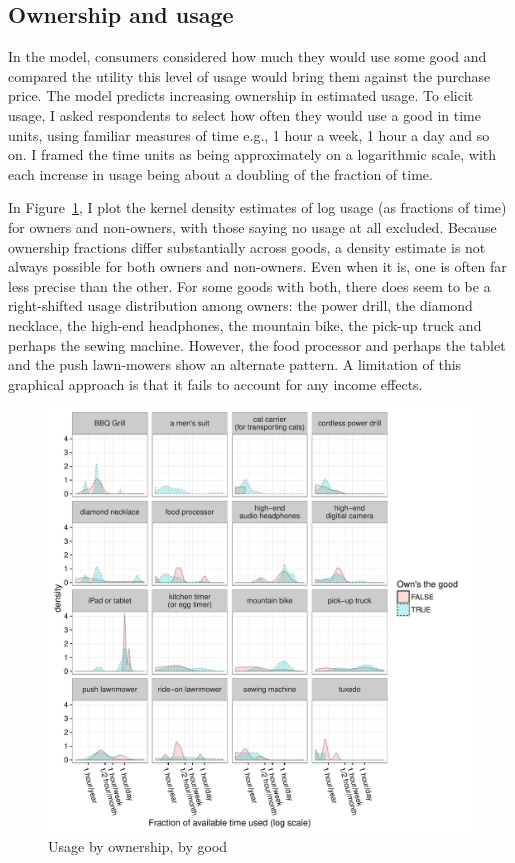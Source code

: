\documentclass[11pt]{article}
\begin{document}


\subsection{Ownership and usage} 
In the model, consumers considered how much they would use some good and compared the utility this level of usage would bring them against the purchase price. 
The model predicts increasing ownership in estimated usage. 
To elicit usage, I asked respondents to select how often they would use a good in time units, using familiar measures of time e.g., 1 hour a week, 1 hour a day and so on.
I framed the time units as being approximately on a logarithmic scale, with each increase in usage being about a doubling of the fraction of time.  

In Figure~\ref{fig:ownership_distro}, I plot the kernel density estimates of log usage (as fractions of time) for owners and non-owners, with those saying no usage at all excluded. 
Because ownership fractions differ substantially across goods, a density estimate is not always possible for both owners and non-owners. 
Even when it is, one is often far less precise than the other. 
For some goods with both, there does seem to be a right-shifted usage distribution among owners: 
the power drill, the diamond necklace, the high-end headphones, the mountain bike, the pick-up truck and perhaps the sewing machine. 
However, the food processor and perhaps the tablet and the push lawn-mowers show an alternate pattern. 
A limitation of this graphical approach is that it fails to account for any income effects. 

\begin{figure}
\centering 
\caption{Usage by ownership, by good \label{fig:ownership_distro}}
\begin{minipage}{0.90 \linewidth}
\includegraphics[width = \linewidth]{./plots/ownership_distro.pdf} 
\end{minipage} 
\end{figure} 
\end{document}
